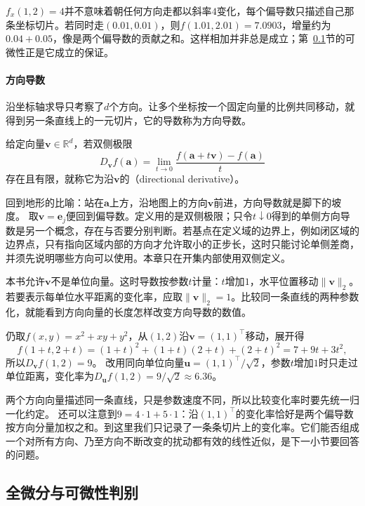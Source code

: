 $f_x(1,2)=4$并不意味着朝任何方向走都以斜率$4$变化，每个偏导数只描述自己那条坐标切片。若同时走$(0.01,0.01)$，则$f(1.01,2.01)=7.0903$，增量约为$0.04+0.05$，像是两个偏导数的贡献之和。这样相加并非总是成立；第~\ref{sec:multivariable-total-differentiation}节的可微性正是它成立的保证。

\paragraph{方向导数}

沿坐标轴求导只考察了$d$个方向。让多个坐标按一个固定向量的比例共同移动，就得到另一条直线上的一元切片，它的导数称为方向导数。
\begin{definition}[方向导数]
\label{def:multivariable-directional-derivative}
给定向量$\bm v\in\mathbb R^d$，若双侧极限
\[
 D_{\bm v}f(\bm a)
 =\lim_{t\to0}\frac{f(\bm a+t\bm v)-f(\bm a)}t
\]
存在且有限，就称它为沿$\bm v$的（directional derivative）。
\end{definition}
回到地形的比喻：站在$\bm a$上方，沿地图上的方向$\bm v$前进，方向导数就是脚下的坡度。
取$\bm v=\bm e_j$便回到偏导数。定义用的是双侧极限；只令$t\downarrow0$得到的单侧方向导数是另一个概念，存在与否要分别判断。若基点在定义域的边界上，例如闭区域的边界点，只有指向区域内部的方向才允许取小的正步长，这时只能讨论单侧差商，并须先说明哪些方向可以使用。本章只在开集内部使用双侧定义。

本书允许$\bm v$不是单位向量。这时导数按参数$t$计量：$t$增加$1$，水平位置移动$\lVert\bm v\rVert_2$。若要表示每单位水平距离的变化率，应取$\lVert\bm v\rVert_2=1$。比较同一条直线的两种参数化，就能看到方向向量的长度怎样改变方向导数的数值。
\begin{example}[沿对角方向的方向导数]
\label{ex:multivariable-diagonal-directional-derivative}
仍取$f(x,y)=x^2+xy+y^2$，从$(1,2)$沿$\bm v=(1,1)^\top$移动，展开得
\[
 f(1+t,2+t)=(1+t)^2+(1+t)(2+t)+(2+t)^2=7+9t+3t^2,
\]
所以$D_{\bm v}f(1,2)=9$。
改用同向单位向量$\bm u=(1,1)^\top/\sqrt2$，参数$t$增加$1$时只走过单位距离，变化率为$D_{\bm u}f(1,2)=9/\sqrt2\approx6.36$。
\end{example}

两个方向向量描述同一条直线，只是参数速度不同，所以比较变化率时要先统一归一化约定。
还可以注意到$9=4\cdot1+5\cdot1$：沿$(1,1)^\top$的变化率恰好是两个偏导数按方向分量加权之和。到这里我们只记录了一条条切片上的变化率。它们能否组成一个对所有方向、乃至方向不断改变的扰动都有效的线性近似，是下一小节要回答的问题。

\subsection{全微分与可微性判别}
\label{sec:multivariable-total-differentiation}

